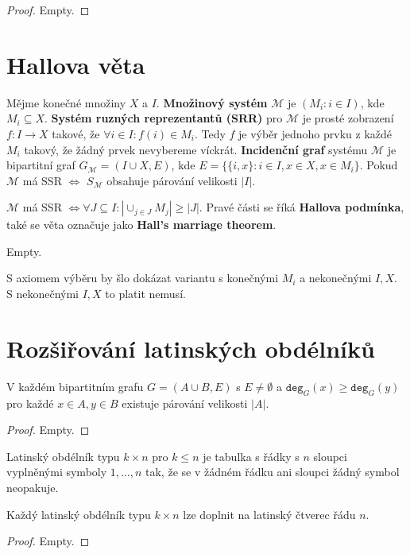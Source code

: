 \begin{proof}
	Empty.
\end{proof}

\section{Hallova věta}

\begin{definice}
	Mějme konečné množiny $X$ a $I$. \textbf{Množinový systém} $\mathcal{M}$ je $(M_{i}: i \in I)$, kde $M_{i} \subseteq X$. \textbf{Systém ruzných reprezentantů (SRR)} pro $\mathcal{M}$ je prosté zobrazení $f: I \to X$ takové, že $\forall i \in I : f(i) \in M_{i}$. Tedy $f$ je výběr jednoho prvku z každé $M_{i}$ takový, že žádný prvek nevybereme víckrát. \textbf{Incidenční graf} systému $\mathcal{M}$ je bipartitní graf $G_{\mathcal{M}}=(I \cup X, E)$, kde $E = \{ \{ i,x\}: i \in I, x \in X, x \in M_{i} \}$. Pokud $\mathcal{M}$ má SSR $\Leftrightarrow$ $S_{\mathcal{M}}$ obsahuje párování velikosti $|I|$.
\end{definice}

\begin{veta}
	$\mathcal{M}$ má SSR $\Leftrightarrow \forall J \subseteq I: |\cup_{j \in J}M_{j}| \geq |J|$. Pravé části se říká \textbf{Hallova podmínka}, také se věta označuje jako \textbf{Hall's marriage theorem}.
\end{veta}

\begin{definice}
	Empty.
\end{definice}


S axiomem výběru by šlo dokázat variantu s konečnými $M_{i}$ a nekonečnými $I,X$. S nekonečnými $I,X$ to platit nemusí.

\section{Rozšiřování latinských obdélníků}

\begin{dusl}
	V každém bipartitním grafu $G =  (A \cup B, E)$ s $E \neq \emptyset$ a $\mathtt{deg}_{G}(x) \geq \mathtt{deg}_{G}(y)$ pro každé $x \in A, y \in B$ existuje párování velikosti $|A|$.
\end{dusl}

\begin{proof}
	Empty.
\end{proof}

Latinský obdélník typu $k \times n$ pro $k \leq n$ je tabulka s řádky s $n$ sloupci vyplněnými symboly $1, \dots, n$ tak, že se v žádném řádku ani sloupci žádný symbol neopakuje.

\begin{veta}
	Každý latinský obdélník typu $k \times n$ lze doplnit na latinský čtverec řádu  $n$.
\end{veta}

\begin{proof}
	Empty.
\end{proof}
